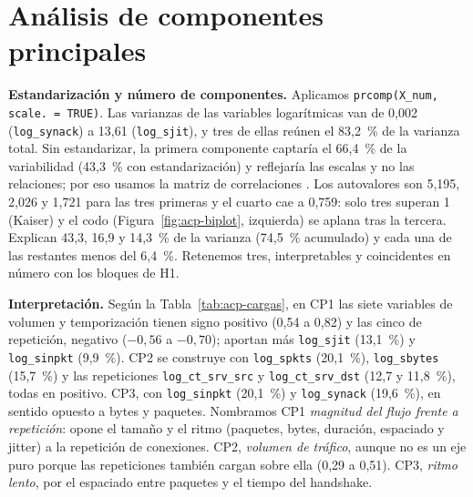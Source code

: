 \section{Análisis de componentes principales}
\label{sec:acp}

\textbf{Estandarización y número de componentes.} Aplicamos \texttt{prcomp(X\_num,\allowbreak{} scale. = TRUE)}. Las varianzas de las variables logarítmicas van de 0,002 (\texttt{log\_synack}) a 13,61 (\texttt{log\_sjit}), y tres de ellas reúnen el 83,2~\% de la varianza total. Sin estandarizar, la primera componente captaría el 66,4~\% de la variabilidad (43,3~\% con estandarización) y reflejaría las escalas y no las relaciones; por eso usamos la matriz de correlaciones \citep{johnson2007}. Los autovalores son 5,195, 2,026 y 1,721 para las tres primeras y el cuarto cae a 0,759: solo tres superan 1 (Kaiser) y el codo (Figura~\ref{fig:acp-biplot}, izquierda) se aplana tras la tercera. Explican 43,3, 16,9 y 14,3~\% de la varianza (74,5~\% acumulado) y cada una de las restantes menos del 6,4~\%. Retenemos tres, interpretables y coincidentes en número con los bloques de H1.

\textbf{Interpretación.} Según la Tabla~\ref{tab:acp-cargas}, en CP1 las siete variables de volumen y temporización tienen signo positivo (0,54 a 0,82) y las cinco de repetición, negativo ($-0{,}56$ a $-0{,}70$); aportan más \texttt{log\_sjit} (13,1~\%) y \texttt{log\_sinpkt} (9,9~\%). CP2 se construye con \texttt{log\_spkts} (20,1~\%), \texttt{log\_sbytes} (15,7~\%) y las repeticiones \texttt{log\_ct\_srv\_src} y \texttt{log\_ct\_srv\_dst} (12,7 y 11,8~\%), todas en positivo. CP3, con \texttt{log\_sinpkt} (20,1~\%) y \texttt{log\_synack} (19,6~\%), en sentido opuesto a bytes y paquetes. Nombramos CP1 \emph{magnitud del flujo frente a repetición}: opone el tamaño y el ritmo (paquetes, bytes, duración, espaciado y jitter) a la repetición de conexiones. CP2, \emph{volumen de tráfico}, aunque no es un eje puro porque las repeticiones también cargan sobre ella (0,29 a 0,51). CP3, \emph{ritmo lento}, por el espaciado entre paquetes y el tiempo del handshake.


